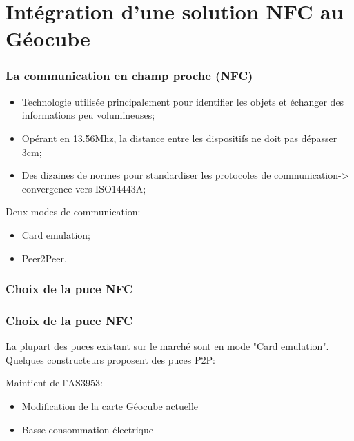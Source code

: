 \documentclass{beamer}
\begin{document}
\section{Intégration d'une solution NFC au Géocube}

\begin{frame}
\frametitle{La communication en champ proche (NFC)}
\begin{itemize}
\item Technologie utilisée principalement pour identifier les objets et échanger des informations peu volumineuses;
\item Opérant en 13.56Mhz, la distance entre les dispositifs ne doit pas dépasser 3cm;
\item Des dizaines de normes pour standardiser les protocoles de communication-> convergence vers ISO14443A;
\end{itemize}
Deux modes de communication:
\begin{itemize}
\item Card emulation;
\item Peer2Peer.
\end{itemize}
\end{frame}

\subsubsection{Choix de la puce NFC}
\begin{frame}
\frametitle{Choix de la puce NFC}
La plupart des puces existant sur le marché sont en mode "Card emulation". Quelques constructeurs proposent des puces P2P:

\begin{table}
\centering
{}
\end{table}

Maintient de l'AS3953:
\begin{itemize}
\item Modification de la carte Géocube actuelle
\item Basse consommation électrique
\end{itemize}

\end{frame}
\end{document}
